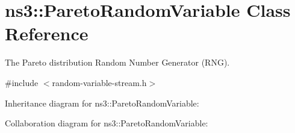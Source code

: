 \hypertarget{classns3_1_1ParetoRandomVariable}{}\section{ns3\+:\+:Pareto\+Random\+Variable Class Reference}
\label{classns3_1_1ParetoRandomVariable}


The Pareto distribution Random Number Generator (R\+NG).  




{\ttfamily \#include $<$random-\/variable-\/stream.\+h$>$}



Inheritance diagram for ns3\+:\+:Pareto\+Random\+Variable\+:


Collaboration diagram for ns3\+:\+:Pareto\+Random\+Variable\+:
